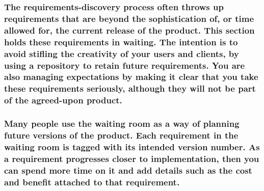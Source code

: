 \documentclass[
]{article}
\begin{document}
\hypertarget{the-requirements-discovery-process-often-throws-up-requirements-that-are-beyond-the-sophistication-of-or-time-allowed-for-the-current-release-of-the-product.-this-section-holds-these-requirements-in-waiting.-the-intention-is-to-avoid-stifling-the-creativity-of-your-users-and-clients-by-using-a-repository-to-retain-future-requirements.-you-are-also-managing-expectations-by-making-it-clear-that-you-take-these-requirements-seriously-although-they-will-not-be-part-of-the-agreed-upon-product.}{%
\subsubsection{The requirements-discovery process often throws up
requirements that are beyond the sophistication of, or time allowed for,
the current release of the product. This section holds these
requirements in waiting. The intention is to avoid stifling the
creativity of your users and clients, by using a repository to retain
future requirements. You are also managing expectations by making it
clear that you take these requirements seriously, although they will not
be part of the agreed-upon
product.}\label{the-requirements-discovery-process-often-throws-up-requirements-that-are-beyond-the-sophistication-of-or-time-allowed-for-the-current-release-of-the-product.-this-section-holds-these-requirements-in-waiting.-the-intention-is-to-avoid-stifling-the-creativity-of-your-users-and-clients-by-using-a-repository-to-retain-future-requirements.-you-are-also-managing-expectations-by-making-it-clear-that-you-take-these-requirements-seriously-although-they-will-not-be-part-of-the-agreed-upon-product.}}

\hypertarget{many-people-use-the-waiting-room-as-a-way-of-planning-future-versions-of-the-product.-each-requirement-in-the-waiting-room-is-tagged-with-its-intended-version-number.-as-a-requirement-progresses-closer-to-implementation-then-you-can-spend-more-time-on-it-and-add-details-such-as-the-cost-and-benefit-attached-to-that-requirement.}{%
\subsubsection{Many people use the waiting room as a way of planning
future versions of the product. Each requirement in the waiting room is
tagged with its intended version number. As a requirement progresses
closer to implementation, then you can spend more time on it and add
details such as the cost and benefit attached to that
requirement.}\label{many-people-use-the-waiting-room-as-a-way-of-planning-future-versions-of-the-product.-each-requirement-in-the-waiting-room-is-tagged-with-its-intended-version-number.-as-a-requirement-progresses-closer-to-implementation-then-you-can-spend-more-time-on-it-and-add-details-such-as-the-cost-and-benefit-attached-to-that-requirement.}}
\end{document}
